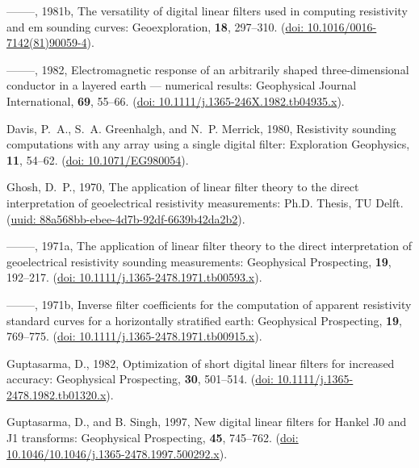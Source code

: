 \documentclass[paper,twocolumn,twoside]{geophysics}
\begin{document}
\begin{thebibliography}{}
--------, 1981b, The versatility of digital linear filters used in computing
  resistivity and em sounding curves: Geoexploration, {\bf 18}, 297--310.
\newblock (\href{http://doi.org/10.1016/0016-7142(81)90059-4}{doi:
  10.1016/0016-7142(81)90059-4}).

--------, 1982, Electromagnetic response of an arbitrarily shaped
  three-dimensional conductor in a layered earth — numerical results:
  Geophysical Journal International, {\bf 69}, 55--66.
\newblock (\href{http://doi.org/10.1111/j.1365-246X.1982.tb04935.x}{doi:
  10.1111/j.1365-246X.1982.tb04935.x}).

Davis, P.~A., S.~A. Greenhalgh, and N.~P. Merrick,  1980, Resistivity sounding
  computations with any array using a single digital filter: Exploration
  Geophysics, {\bf 11}, 54--62.
\newblock (\href{http://library.seg.org/doi/abs/10.1071/EG980054}{doi:
  10.1071/EG980054}).

Ghosh, D.~P.,  1970, The application of linear filter theory to the direct
  interpretation of geoelectrical resistivity measurements: {Ph.D. Thesis}, {TU
  Delft}.
\newblock
  (\href{http://resolver.tudelft.nl/uuid:88a568bb-ebee-4d7b-92df-6639b42da2b2}{uuid:
  88a568bb-ebee-4d7b-92df-6639b42da2b2}).

--------, 1971a, The application of linear filter theory to the direct
  interpretation of geoelectrical resistivity sounding measurements:
  Geophysical Prospecting, {\bf 19}, 192--217.
\newblock (\href{http://doi.org/10.1111/j.1365-2478.1971.tb00593.x}{doi:
  10.1111/j.1365-2478.1971.tb00593.x}).

--------, 1971b, Inverse filter coefficients for the computation of apparent
  resistivity standard curves for a horizontally stratified earth: Geophysical
  Prospecting, {\bf 19}, 769--775.
\newblock (\href{http://doi.org/10.1111/j.1365-2478.1971.tb00915.x}{doi:
  10.1111/j.1365-2478.1971.tb00915.x}).

Guptasarma, D.,  1982, Optimization of short digital linear filters for
  increased accuracy: Geophysical Prospecting, {\bf 30}, 501--514.
\newblock (\href{http://doi.org/10.1111/j.1365-2478.1982.tb01320.x}{doi:
  10.1111/j.1365-2478.1982.tb01320.x}).

Guptasarma, D., and B. Singh,  1997, New digital linear filters for {H}ankel
  {J}0 and {J}1 transforms: Geophysical Prospecting, {\bf 45}, 745--762.
\newblock (\href{http://doi.org/10.1046/j.1365-2478.1997.500292.x}{doi:
  10.1046/10.1046/j.1365-2478.1997.500292.x}).


\end{thebibliography}
\end{document}
